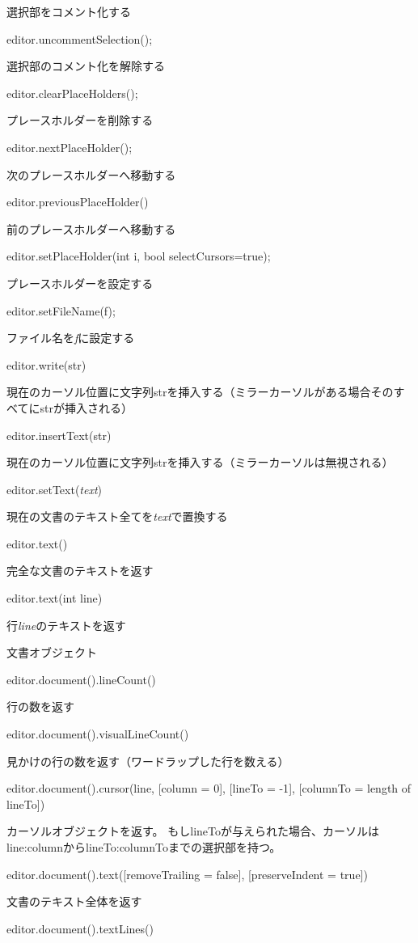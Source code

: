 \documentclass[]{book}
\begin{document}
選択部をコメント化する

editor.uncommentSelection();

選択部のコメント化を解除する

editor.clearPlaceHolders();

プレースホルダーを削除する

editor.nextPlaceHolder();

次のプレースホルダーへ移動する

editor.previousPlaceHolder()

前のプレースホルダーへ移動する

editor.setPlaceHolder(int i, bool selectCursors=true);

プレースホルダーを設定する

editor.setFileName(f);

ファイル名を\emph{f}に設定する

editor.write(str)

現在のカーソル位置に文字列strを挿入する（ミラーカーソルがある場合そのすべてにstrが挿入される）

editor.insertText(str)

現在のカーソル位置に文字列strを挿入する（ミラーカーソルは無視される）

editor.setText(\emph{text})

現在の文書のテキスト全てを\emph{text}で置換する

editor.text()

完全な文書のテキストを返す

editor.text(int line)

行\emph{line}のテキストを返す

文書オブジェクト

editor.document().lineCount()

行の数を返す

editor.document().visualLineCount()

見かけの行の数を返す（ワードラップした行を数える）

editor.document().cursor(line, {[}column = 0{]}, {[}lineTo = -1{]},
{[}columnTo = length of lineTo{]})

カーソルオブジェクトを返す。
もしlineToが与えられた場合、カーソルはline:columnからlineTo:columnToまでの選択部を持つ。

editor.document().text({[}removeTrailing = false{]}, {[}preserveIndent =
true{]})

文書のテキスト全体を返す

editor.document().textLines()
\end{document}
